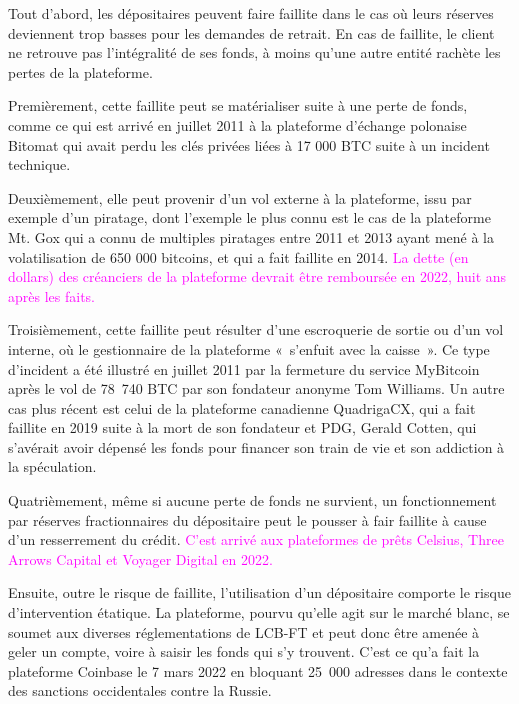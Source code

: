Tout d'abord, les dépositaires peuvent faire faillite dans le cas où leurs réserves deviennent trop basses pour les demandes de retrait. En cas de faillite, le client ne retrouve pas l'intégralité de ses fonds, à moins qu'une autre entité rachète les pertes de la plateforme.

Premièrement, cette faillite peut se matérialiser suite à une perte de fonds, comme ce qui est arrivé en juillet 2011 à la plateforme d'échange polonaise Bitomat qui avait perdu les clés privées liées à 17 000 BTC suite à un incident technique.

Deuxièmement, elle peut provenir d'un vol externe à la plateforme, issu par exemple d'un piratage, dont l'exemple le plus connu est le cas de la plateforme Mt. Gox qui a connu de multiples piratages entre 2011 et 2013 ayant mené à la volatilisation de 650 000 bitcoins, et qui a fait faillite en 2014. \textcolor{magenta}{La dette (en dollars) des créanciers de la plateforme devrait être remboursée en 2022, huit ans après les faits.}

Troisièmement, cette faillite peut résulter d'une escroquerie de sortie ou d'un vol interne, où le gestionnaire de la plateforme «~s'enfuit avec la caisse~». Ce type d'incident a été illustré en juillet 2011 par la fermeture du service MyBitcoin après le vol de 78~740 BTC par son fondateur anonyme Tom Williams. Un autre cas plus récent est celui de la plateforme canadienne QuadrigaCX, qui a fait faillite en 2019 suite à la mort de son fondateur et PDG, Gerald Cotten, qui s'avérait avoir dépensé les fonds pour financer son train de vie et son addiction à la spéculation.

Quatrièmement, même si aucune perte de fonds ne survient, un fonctionnement par réserves fractionnaires du dépositaire peut le pousser à fair faillite à cause d'un resserrement du crédit. \textcolor{magenta}{C'est arrivé aux plateformes de prêts Celsius, Three Arrows Capital et Voyager Digital en 2022.}

Ensuite, outre le risque de faillite, l'utilisation d'un dépositaire comporte le risque d'intervention étatique. La plateforme, pourvu qu'elle agit sur le marché blanc, se soumet aux diverses réglementations de LCB-FT et peut donc être amenée à geler un compte, voire à saisir les fonds qui s'y trouvent. C'est ce qu'a fait la plateforme Coinbase le 7 mars 2022 en bloquant 25~000 adresses dans le contexte des sanctions occidentales contre la Russie.

